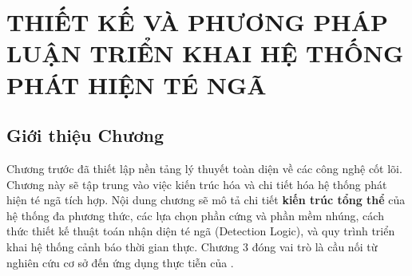 \chapter[THIẾT KẾ HỆ THỐNG]{THIẾT KẾ VÀ PHƯƠNG PHÁP LUẬN TRIỂN KHAI HỆ THỐNG PHÁT HIỆN TÉ NGÃ}
\label{chap:methodology} %

\section*{Giới thiệu Chương} %
Chương trước đã thiết lập nền tảng lý thuyết toàn diện về các công nghệ cốt lõi. Chương này sẽ tập trung vào việc kiến trúc hóa và chi tiết hóa hệ thống phát hiện té ngã tích hợp. Nội dung chương sẽ mô tả chi tiết \textbf{kiến trúc tổng thể} của hệ thống đa phương thức, các lựa chọn phần cứng và phần mềm nhúng, cách thức thiết kế thuật toán nhận diện té ngã (Detection Logic), và quy trình triển khai hệ thống cảnh báo thời gian thực. Chương 3 đóng vai trò là cầu nối từ nghiên cứu cơ sở đến ứng dụng thực tiễn của \TENLUANVAN.




